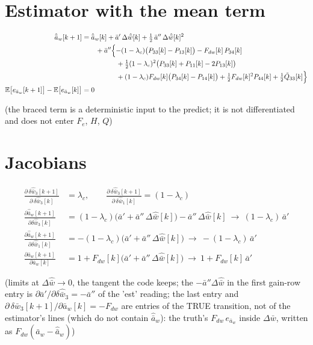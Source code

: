 \documentclass[11pt,a4paper,fontset=none]{ctexart}
\newcommand{\ba}{\bar{a}}
\newcommand{\bw}{\bar{w}}
\newcommand{\E}{\mathbb{E}}
\newcommand{\dW}{\Delta\bw}
\newcommand{\dWh}{\Delta\hat{\bw}}
\newcommand{\ap}{\ba'}
\newcommand{\app}{\ba''}
\begin{document}
\section{Estimator with the mean term}

\begin{align*}
\hat{\ba}_w[k+1] &= \hat{\ba}_w[k] + \ap\,\dWh[k] + \tfrac{1}{2}\,\app\,\dWh[k]^{2} \\
  &\qquad + \app\Bigl\{-(1-\lambda_c)\bigl(P_{33}[k] - P_{13}[k]\bigr) - F_{dw}[k]\,P_{34}[k] \\
  &\qquad\qquad\quad + \tfrac{1}{2}(1-\lambda_c)^{2}\bigl(P_{33}[k] + P_{11}[k] - 2P_{13}[k]\bigr) \\
  &\qquad\qquad\quad + (1-\lambda_c)F_{dw}[k]\bigl(P_{34}[k] - P_{14}[k]\bigr)
     + \tfrac{1}{2}F_{dw}[k]^{2}P_{44}[k] + \tfrac{1}{2}\tilde{Q}_{33}[k]\Bigr\} \\
\E\bigl[e_{\ba_w}[k+1]\bigr] - \E\bigl[e_{\ba_w}[k]\bigr] &= 0
\end{align*}

(the braced term is a deterministic input to the predict; it is not differentiated and does not enter $F_e$, $H$, $Q$)

\section{Jacobians}

\begin{align*}
\frac{\partial\,\delta\hat{\bw}_3[k+1]}{\partial\,\delta\hat{\bw}_3[k]} &= \lambda_c , \qquad
\frac{\partial\,\delta\hat{\bw}_3[k+1]}{\partial\,\delta\hat{\bw}_1[k]} = (1-\lambda_c) \\
\frac{\partial \hat{\ba}_w[k+1]}{\partial \delta\hat{\bw}_3[k]}
  &= (1-\lambda_c)\bigl(\ap + \app\,\dWh[k]\bigr) - \app\,\dWh[k]
  \ \to\ (1-\lambda_c)\,\ap \\
\frac{\partial \hat{\ba}_w[k+1]}{\partial \delta\hat{\bw}_1[k]}
  &= -(1-\lambda_c)\bigl(\ap + \app\,\dWh[k]\bigr)
  \ \to\ -(1-\lambda_c)\,\ap \\
\frac{\partial \ba_w[k+1]}{\partial \ba_w[k]}
  &= 1 + F_{dw}[k]\bigl(\ap + \app\,\dWh[k]\bigr)
  \ \to\ 1 + F_{dw}[k]\,\ap
\end{align*}

(limits at $\dWh \to 0$, the tangent the code keeps; the $-\app\dWh$ in the first gain-row entry is $\partial\ap/\partial\delta\hat{\bw}_3 = -\app$ of the 'est' reading;
the last entry and $\partial\,\delta\bw_3[k+1]/\partial\ba_w[k] = -F_{dw}$ are entries of the TRUE transition, not of the estimator's lines
(which do not contain $\hat{\ba}_w$): the truth's $F_{dw}\,e_{\ba_w}$ inside $\dW$, written as $F_{dw}(\ba_w - \hat{\ba}_w)$)
\end{document}
